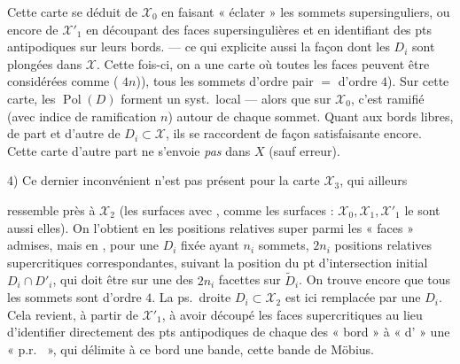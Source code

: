 \documentclass[11pt,a4paper]{article}
\begin{document}
Cette carte  se déduit de $\mathcal{X}_0$ en faisant « éclater » les sommets supersinguliers, ou encore de $\mathcal{X}'_1$ en découpant  des faces supersingulières et en identifiant des pts antipodiques sur leurs bords. --- ce qui explicite aussi la façon dont les $D_i$ sont plongées dans $\mathcal{X}$. Cette fois-ci, on a une carte où toutes les faces peuvent être considérées comme  \add{\ill{}} (\struck{\ill{}} $4n$)), \ill{} tous les sommets d'ordre pair  $=$ d'ordre $4$). Sur cette carte, les $\operatorname{Pol}(D)$ forment un syst.\ local  --- alors que sur $\mathcal{X}_0$, c'est ramifié (avec indice de ramification $n$) autour de chaque sommet. Quant aux bords libres, de part et d'autre de $D_i \subset \mathcal{X}$, ils se raccordent de façon satisfaisante encore. Cette carte d'autre part ne s'envoie \emph{pas} dans $X$ (sauf erreur).


4) Ce dernier inconvénient n'est pas présent pour la carte $\mathcal{X}_3$, qui \struck{\ill{}}  ailleurs

ressemble  près à $\mathcal{X}_2$ (les surfaces avec  , \ill{} comme les surfaces \ill{} \ill{} : $\mathcal{X}_0, \mathcal{X}_1, \mathcal{X}'_1$ le sont aussi elles). On l'obtient en  \struck{\ill{}} les positions relatives super  \struck{\ill{}} parmi les « faces » admises, mais en  \struck{\ill{} \ill{}}, pour une $D_i$ fixée ayant $n_i$ sommets, $2n_i$ positions relatives super\ill{}critiques correspondantes, suivant la position  du pt d'intersection initial $D_i \cap D'_i$, qui doit être sur une des $2n_i$ facettes sur $\widetilde{D}_i$. On trouve encore que tous les sommets sont d'ordre $4$. La \struck{\ill{}} ps.\ droite $D_i \subset \mathcal{X}_2$  \struck{\ill{}} est ici remplacée par une \ill{} \ill{} $D_i$. Cela revient, à partir de $\mathcal{X}'_1$, \struck{\ill{}} à   avoir découpé les faces supercritiques   \ill{} au lieu d'identifier directement des pts antipodiques de chaque \ill{} \ill{} des « \struck{\ill{}} bord » à «  d' » \struck{\ill{}} une « p.r.\ \ill{} », qui délimite à ce bord  une bande, cette bande de Möbius.
\end{document}
